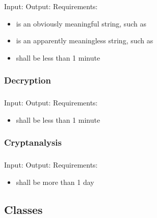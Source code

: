 \begin{frame}
\frametitle{\alice}
Input: \encryptin \medskip
Output: \encryptout \medskip
Requirements:
\begin{itemize}
\item \plaintextarg{} is an obviously meaningful string,
  such as \plaintextex
\item \ciphertextarg{} is an apparently meaningless string,
  such as \ciphertextex
\item \encrypttime{} shall be less than 1 minute
\end{itemize}
\end{frame}

\subsubsection{Decryption}
\begin{frame}
\frametitle{\bob}
Input: \decryptin \medskip
Output: \decryptout \medskip
Requirements:
\begin{itemize}
\item \decrypttime{} shall be less than 1 minute
\end{itemize}
\end{frame}

\subsubsection{Cryptanalysis}
\begin{frame}
\frametitle{\eve}
Input: \cryptanalyzein \medskip
Output: \cryptanalyzeout \medskip
Requirements:
\begin{itemize}
\item \cryptanalyzetime{} shall be more than 1 day
\end{itemize}
\end{frame}


\subsection{Classes}
\lstset{language=C++} %
\newcommand{\csh}{../../src/\cs/\cs.h}

\begin{frame}
\frametitle{}
\codes{}
\end{frame}

\begin{frame}
\codes{}
\end{frame}

